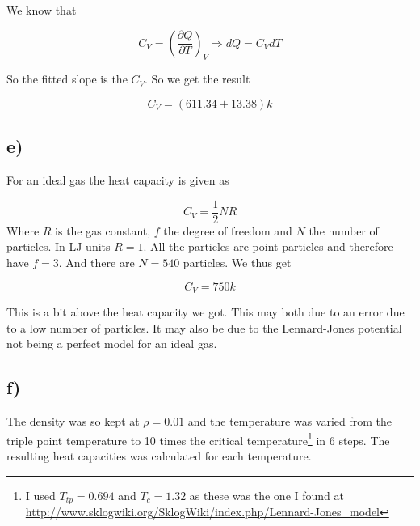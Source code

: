 \documentclass[a4paper,norsk, 10pt]{article}
\newcommand{\pd}[2]{\frac{\partial #1}{\partial #2}}
\begin{document}
We know that 

\begin{equation}
C_V = \left(\pd{Q}{T}\right)_V \Rightarrow dQ = C_VdT
\end{equation}

So the fitted slope is the $C_V$. So we get the result

\begin{equation}
C_V = (611.34 \pm 13.38) k
\end{equation}


\subsection{e)}
For an ideal gas the heat capacity is given as

\begin{equation}
C_V = \frac{1}{2}NR
\end{equation}
Where $R$ is the gas constant, $f$ the degree of freedom and $N$ the number of particles. In LJ-units $R = 1$. All the particles are point particles and therefore have $f = 3$. And there are $N = 540$ particles. We thus get

\begin{equation}
C_V = 750 k
\end{equation}

This is a bit above the heat capacity we got. This may both due to an error due to a low number of particles. It may also be due to the Lennard-Jones potential not being a perfect model for an ideal gas.


\subsection{f)}
The density was so kept at $\rho = 0.01$ and the temperature was varied from the triple point temperature to 10 times the critical temperature\footnote{I used $T_{tp} = 0.694$ and $T_c = 1.32$ as these was the one I found at \url{http://www.sklogwiki.org/SklogWiki/index.php/Lennard-Jones_model}} in 6 steps. The resulting heat capacities was calculated for each temperature.
\end{document}
